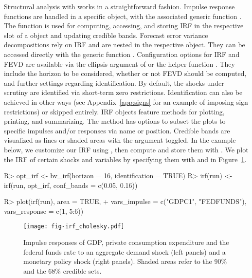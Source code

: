 \documentclass[article,nojss]{jss} %
\begin{document}
Structural analysis with  works in a straightforward fashion. Impulse response functions are handled in a specific object, with the associated generic function . The function is used for computing, accessing, and storing IRF in the respective slot of a  object and updating credible bands.
Forecast error variance decompositions rely on IRF and are nested in the respective object. They can be accessed directly with the generic function .
Configuration options for IRF and FEVD are available via the ellipsis argument of  or the helper function . They include the horizon to be considered, whether or not FEVD should be computed, and further settings regarding identification. By default, the shocks under scrutiny are identified via short-term zero restrictions. Identification can also be achieved in other ways (see Appendix~\ref{app:signs} for an example of imposing sign restrictions) or skipped entirely.
IRF objects feature methods for plotting, printing, and summarizing. The  method has options to subset the plots to specific impulses and/or responses via name or position. Credible bands are visualized as lines or shaded areas with the  argument toggled.
In the example below, we customize our IRF using , then compute and store them with . We plot the IRF of certain shocks and variables by specifying them with  and  in Figure~\ref{fig:irf_cholesky}.

\begin{Schunk}
\begin{Sinput}
R> opt_irf <- bv_irf(horizon = 16, identification = TRUE)
R> irf(run) <- irf(run, opt_irf, conf_bands = c(0.05, 0.16))
\end{Sinput}
\end{Schunk}
\begin{Schunk}
\begin{Sinput}
R> plot(irf(run), area = TRUE,
+    vars_impulse = c("GDPC1", "FEDFUNDS"), vars_response = c(1, 5:6))
\end{Sinput}
\end{Schunk}

\begin{figure}[ht]
  \centering
  \texttt{[image: fig-irf\_cholesky.pdf]}
  \caption{Impulse responses of GDP, private consumption expenditure and the federal funds rate to an aggregate demand shock (left panels) and a monetary policy shock (right panels). Shaded areas refer to the 90\% and the 68\% credible sets.}
  \label{fig:irf_cholesky}
\end{figure}
\end{document}
